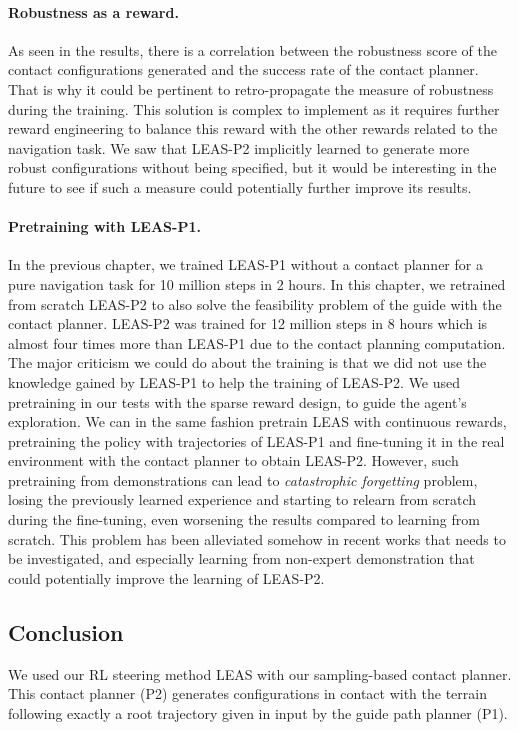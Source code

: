 \paragraph{Robustness as a reward.} 
As seen in the results, there is a correlation between the robustness score of the contact configurations generated and the success rate of the contact planner. 
That is why it could be pertinent to retro-propagate the measure of robustness during the training.
This solution is complex to implement as it requires further reward engineering to balance this reward with the other rewards related to the navigation task. 
We saw that LEAS-P2 implicitly learned to generate more robust configurations without being specified, but it would be interesting in the future to see if such a measure could potentially further improve its results.

\paragraph{Pretraining with LEAS-P1.} 
In the previous chapter, we trained LEAS-P1 without a contact planner for a pure navigation task for 10 million steps in 2 hours. 
In this chapter, we retrained from scratch LEAS-P2 to also solve the feasibility problem of the guide with the contact planner. LEAS-P2 was trained for 12 million steps in 8 hours which is almost four times more than LEAS-P1 due to the contact planning computation. 
The major criticism we could do about the training is that we did not use the knowledge gained by LEAS-P1 to help the training of LEAS-P2.
We used pretraining in our tests with the sparse reward design, to guide the agent's exploration.
We can in the same fashion pretrain LEAS with continuous rewards, pretraining the policy with trajectories of LEAS-P1 and fine-tuning it in the real environment with the contact planner to obtain LEAS-P2.
However, such pretraining from demonstrations can lead to \textit{catastrophic forgetting} problem, losing the previously learned experience and starting to relearn from scratch during the fine-tuning, even worsening the results compared to learning from scratch.
This problem has been alleviated somehow in recent works \cite{DDPGfd,pretraining_BC} that needs to be investigated, and especially learning from non-expert demonstration \cite{learning_from_non_expert, meta_learning_from_demo} that could potentially improve the learning of LEAS-P2.

\subsection{Conclusion}
We used our RL steering method LEAS with our sampling-based contact planner.
This contact planner (P2) generates configurations in contact with the terrain following exactly a root trajectory given in input by the guide path planner (P1).

